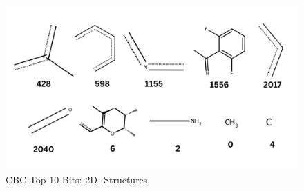  \begin{figure}[htbp!] %
 	\centering
 	\includegraphics[scale=0.30]{top10crudebitsv2.png} %
 	\caption{CBC Top 10 Bits: 2D- Structures}
 	\label{fig:top10crudebits} %
 \end{figure}
 

